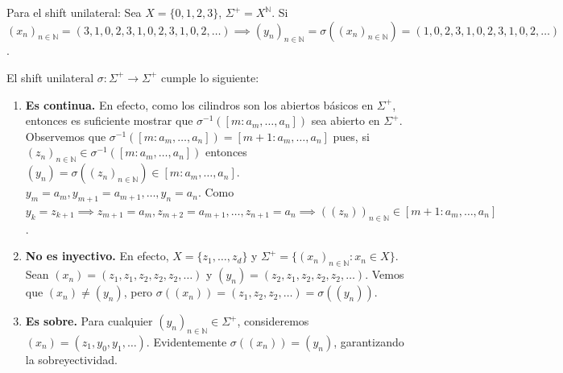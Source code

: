 \begin{ejemplo}
	Para el shift unilateral: Sea $X=\{0,1,2,3\}$, $\Sigma^+ = X^{\mathbb{N}}$.
	Si $(x_n)_{n \in \mathbb{N}} = (3,1,0,2,3,1,0,2,3,1,0,2,\dots) \implies (y_n)_{n \in \mathbb{N}} = \sigma((x_n)_{n \in \mathbb{N}}) = (1,0,2,3,1,0,2,3,1,0,2,\dots)$.
\end{ejemplo}

\begin{proposicion}
	El shift unilateral $\sigma: \Sigma^+ \to \Sigma^+$ cumple lo siguiente:
	\begin{enumerate}
		\item \textbf{Es continua.} En efecto, como los cilindros son los abiertos básicos en $\Sigma^+$, entonces es suficiente mostrar que $\sigma^{-1}([m: a_m, \dots, a_n])$ sea abierto en $\Sigma^+$.
		Observemos que $\sigma^{-1}([m: a_m, \dots, a_n]) = [m+1: a_m, \dots, a_n]$ pues, si $(z_n)_{n \in \mathbb{N}} \in \sigma^{-1}([m: a_m, \dots, a_n])$ entonces $(y_n) = \sigma((z_n)_{n \in \mathbb{N}}) \in [m: a_m, \dots, a_n]$.
		$y_m = a_m, y_{m+1} = a_{m+1}, \dots, y_n = a_n$.
		Como $y_k = z_{k+1} \implies z_{m+1} = a_m, z_{m+2} = a_{m+1}, \dots, z_{n+1} = a_n \implies ((z_n))_{n \in \mathbb{N}} \in [m+1: a_m, \dots, a_n]$.
		\item \textbf{No es inyectivo.} En efecto, $X = \{z_1, \dots, z_d\}$ y $\Sigma^+ = \{(x_n)_{n \in \mathbb{N}} : x_n \in X\}$. Sean $(x_n) = (z_1, z_1, z_2, z_2, z_2, \dots)$ y $(y_n) = (z_2, z_1, z_2, z_2, z_2, \dots)$.
		Vemos que $(x_n) \neq (y_n)$, pero $\sigma((x_n)) = (z_1, z_2, z_2, \dots) = \sigma((y_n))$.
		\item \textbf{Es sobre.} Para cualquier $(y_n)_{n \in \mathbb{N}} \in \Sigma^+$, consideremos $(x_n) = (z_1, y_0, y_1, \dots)$. Evidentemente $\sigma((x_n)) = (y_n)$, garantizando la sobreyectividad.
	\end{enumerate}
\end{proposicion}

